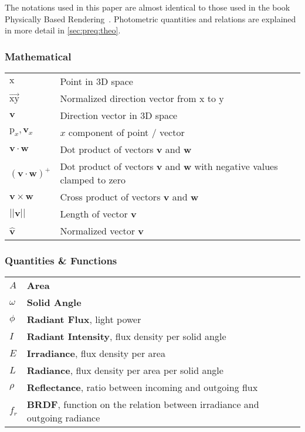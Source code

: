 \documentclass[thesis.tex]{subfiles}
\begin{document}

The notations used in this paper are almost identical to those used in the book Physically Based Rendering~\cite{bib:pbrt}. Photometric quantities and relations are explained in more detail in \autoref{sec:preq:theo}.

\subsubsection*{Mathematical}

\begin{tabular}{ l l }
$\mathrm{x}$ & Point in 3D space \\
$\overrightarrow{\mathrm{x}\mathrm{y}}$ & Normalized direction vector from $\mathrm{x}$ to $\mathrm{y}$\\
$\mathbf{v}$ & Direction vector in 3D space \\
$\mathrm{p}_x, \mathbf{v}_x$ & $x$ component of point / vector\\
$\mathbf{v} \cdot \mathbf{w}$ & Dot product of vectors $\mathbf{v}$ and $\mathbf{w}$\\
$(\mathbf{v} \cdot \mathbf{w})^+$ & Dot product of vectors $\mathbf{v}$ and $\mathbf{w}$ with negative values clamped to zero\\
$\mathbf{v} \times \mathbf{w}$ & Cross product of vectors $\mathbf{v}$ and $\mathbf{w}$\\
$||\mathbf{v}||$ & Length of vector $\mathbf{v}$\\
$\hat{\mathbf{v}}$ & Normalized vector $\mathbf{v}$
\end{tabular}


\subsubsection*{Quantities \& Functions}

\begin{tabular}{ l l l}
$A$ & \textbf{Area}\\
$\omega$ & \textbf{Solid Angle}\\
$\phi$ & \textbf{Radiant Flux}, light power\\
$I$ & \textbf{Radiant Intensity}, flux density per solid angle\\
$E$ & \textbf{Irradiance}, flux density per area\\
$L$ & \textbf{Radiance}, flux density per area per solid angle\\
$\rho$ & \textbf{Reflectance}, ratio between incoming and outgoing flux\\
$f_r$ & \textbf{BRDF}, function on the relation between irradiance and outgoing radiance\\
\end{tabular}
\end{document}
